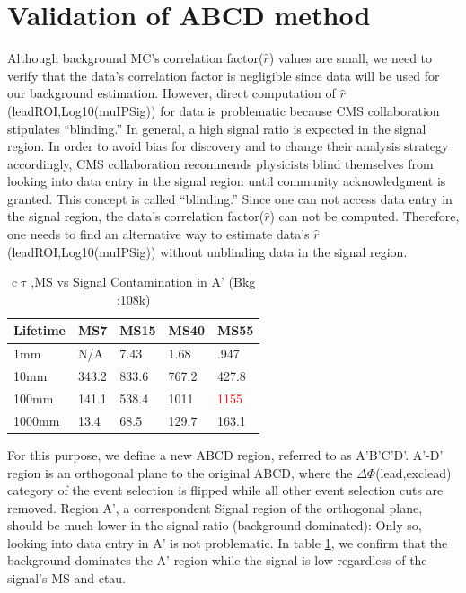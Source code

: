 \section{Validation of ABCD method}
Although background MC's correlation factor($\hat{r}$) values are small, we need to verify that the data's correlation factor is negligible since data will be used for our background estimation.
However, direct computation of $\hat{r}$(leadROI,Log10(muIPSig)) for data is problematic because CMS collaboration stipulates ``blinding.''
In general, a high signal ratio is expected in the signal region.
In order to avoid bias for discovery and to change their analysis strategy accordingly, CMS collaboration recommends physicists blind themselves from looking into data entry in the signal region until community acknowledgment is granted.
This concept is called ``blinding.''
Since one can not access data entry in the signal region, the data's correlation factor($\hat{r}$) can not be computed.
Therefore, one needs to find an alternative way to estimate data's $\hat{r}$(leadROI,Log10(muIPSig)) without unblinding data in the signal region.

\begin{table}[htb]
\centering
\begin{tabular}{|p{3cm}|p{1cm}|p{1cm}|p{1cm}|p{1cm}|}
\hline
Lifetime & MS7 & MS15&MS40&MS55 \\
\hline
1mm & N/A & 7.43 & 1.68 & .947   \\
\hline
10mm & 343.2 & 833.6 & 767.2 & 427.8  \\
\hline
100mm & 141.1& 538.4 & 1011 & \textcolor{red}{1155} \\
\hline
1000mm & 13.4 & 68.5 & 129.7  &  163.1  \\
\hline
\end{tabular}
\label{tab:sigcont}
\centering
\caption{c$\uptau$,MS vs Signal Contamination in A' (Bkg :108k)}
\end{table}
For this purpose, we define a new ABCD region, referred to as A'B'C'D'.
A'-D' region is an orthogonal plane to the original ABCD, where the $\Delta\Phi$(lead,exclead) category of the event selection is flipped while all other event selection cuts are removed.
Region A', a correspondent Signal region of the orthogonal plane, should be much lower in the signal ratio (background dominated): Only so, looking into data entry in A' is not problematic.
In table \ref{tab:sigcont}, we confirm that the background dominates the A' region while the signal is low regardless of the signal's MS and ctau.




